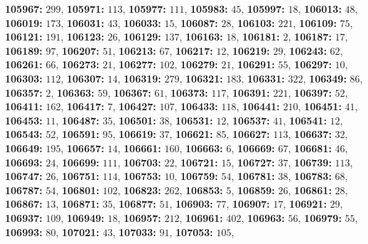 \textsf{\bfseries 105967:} $299$, \textsf{\bfseries 105971:} $113$, \textsf{\bfseries 105977:} $111$, \textsf{\bfseries 105983:} $45$, \textsf{\bfseries 105997:} $18$, \textsf{\bfseries 106013:} $48$, \textsf{\bfseries 106019:} $173$, \textsf{\bfseries 106031:} $43$, \textsf{\bfseries 106033:} $15$, \textsf{\bfseries 106087:} $28$, \textsf{\bfseries 106103:} $221$, \textsf{\bfseries 106109:} $75$, \textsf{\bfseries 106121:} $191$, \textsf{\bfseries 106123:} $26$, \textsf{\bfseries 106129:} $137$, \textsf{\bfseries 106163:} $18$, \textsf{\bfseries 106181:} $2$, \textsf{\bfseries 106187:} $17$, \textsf{\bfseries 106189:} $97$, \textsf{\bfseries 106207:} $51$, \textsf{\bfseries 106213:} $67$, \textsf{\bfseries 106217:} $12$, \textsf{\bfseries 106219:} $29$, \textsf{\bfseries 106243:} $62$, \textsf{\bfseries 106261:} $66$, \textsf{\bfseries 106273:} $21$, \textsf{\bfseries 106277:} $102$, \textsf{\bfseries 106279:} $21$, \textsf{\bfseries 106291:} $55$, \textsf{\bfseries 106297:} $10$, \textsf{\bfseries 106303:} $112$, \textsf{\bfseries 106307:} $14$, \textsf{\bfseries 106319:} $279$, \textsf{\bfseries 106321:} $183$, \textsf{\bfseries 106331:} $322$, \textsf{\bfseries 106349:} $86$, \textsf{\bfseries 106357:} $2$, \textsf{\bfseries 106363:} $59$, \textsf{\bfseries 106367:} $61$, \textsf{\bfseries 106373:} $117$, \textsf{\bfseries 106391:} $221$, \textsf{\bfseries 106397:} $52$, \textsf{\bfseries 106411:} $162$, \textsf{\bfseries 106417:} $7$, \textsf{\bfseries 106427:} $107$, \textsf{\bfseries 106433:} $118$, \textsf{\bfseries 106441:} $210$, \textsf{\bfseries 106451:} $41$, \textsf{\bfseries 106453:} $11$, \textsf{\bfseries 106487:} $35$, \textsf{\bfseries 106501:} $38$, \textsf{\bfseries 106531:} $12$, \textsf{\bfseries 106537:} $41$, \textsf{\bfseries 106541:} $12$, \textsf{\bfseries 106543:} $52$, \textsf{\bfseries 106591:} $95$, \textsf{\bfseries 106619:} $37$, \textsf{\bfseries 106621:} $85$, \textsf{\bfseries 106627:} $113$, \textsf{\bfseries 106637:} $32$, \textsf{\bfseries 106649:} $195$, \textsf{\bfseries 106657:} $14$, \textsf{\bfseries 106661:} $160$, \textsf{\bfseries 106663:} $6$, \textsf{\bfseries 106669:} $67$, \textsf{\bfseries 106681:} $46$, \textsf{\bfseries 106693:} $24$, \textsf{\bfseries 106699:} $111$, \textsf{\bfseries 106703:} $22$, \textsf{\bfseries 106721:} $15$, \textsf{\bfseries 106727:} $37$, \textsf{\bfseries 106739:} $113$, \textsf{\bfseries 106747:} $26$, \textsf{\bfseries 106751:} $114$, \textsf{\bfseries 106753:} $10$, \textsf{\bfseries 106759:} $54$, \textsf{\bfseries 106781:} $38$, \textsf{\bfseries 106783:} $68$, \textsf{\bfseries 106787:} $54$, \textsf{\bfseries 106801:} $102$, \textsf{\bfseries 106823:} $262$, \textsf{\bfseries 106853:} $5$, \textsf{\bfseries 106859:} $26$, \textsf{\bfseries 106861:} $28$, \textsf{\bfseries 106867:} $13$, \textsf{\bfseries 106871:} $35$, \textsf{\bfseries 106877:} $51$, \textsf{\bfseries 106903:} $77$, \textsf{\bfseries 106907:} $17$, \textsf{\bfseries 106921:} $29$, \textsf{\bfseries 106937:} $109$, \textsf{\bfseries 106949:} $18$, \textsf{\bfseries 106957:} $212$, \textsf{\bfseries 106961:} $402$, \textsf{\bfseries 106963:} $56$, \textsf{\bfseries 106979:} $55$, \textsf{\bfseries 106993:} $80$, \textsf{\bfseries 107021:} $43$, \textsf{\bfseries 107033:} $91$, \textsf{\bfseries 107053:} $105$, 
